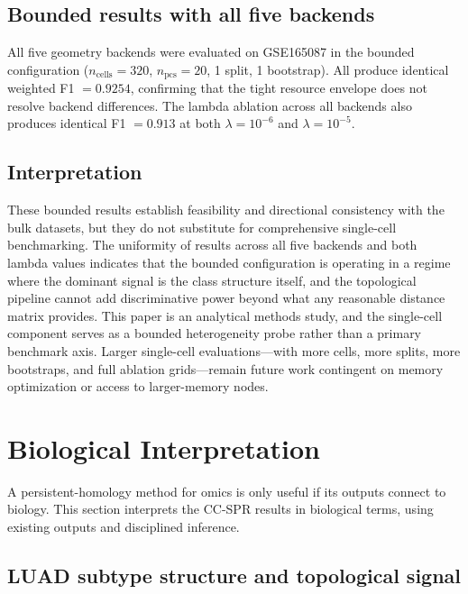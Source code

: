 \documentclass[11pt]{article}
\begin{document}
\subsection{Bounded results with all five backends}

All five geometry backends were evaluated on GSE165087 in the bounded configuration ($n_{\text{cells}} = 320$, $n_{\text{pcs}} = 20$, 1 split, 1 bootstrap).
All produce identical weighted F1 $= 0.9254$, confirming that the tight resource envelope does not resolve backend differences.
The lambda ablation across all backends also produces identical F1 $= 0.913$ at both $\lambda = 10^{-6}$ and $\lambda = 10^{-5}$.

\subsection{Interpretation}

These bounded results establish feasibility and directional consistency with the bulk datasets, but they do not substitute for comprehensive single-cell benchmarking.
The uniformity of results across all five backends and both lambda values indicates that the bounded configuration is operating in a regime where the dominant signal is the class structure itself, and the topological pipeline cannot add discriminative power beyond what any reasonable distance matrix provides.
This paper is an analytical methods study, and the single-cell component serves as a bounded heterogeneity probe rather than a primary benchmark axis.
Larger single-cell evaluations---with more cells, more splits, more bootstraps, and full ablation grids---remain future work contingent on memory optimization or access to larger-memory nodes.

\section{Biological Interpretation}
\label{sec:biology}

A persistent-homology method for omics is only useful if its outputs connect to biology.
This section interprets the CC-SPR results in biological terms, using existing outputs and disciplined inference.

\subsection{LUAD subtype structure and topological signal}
\end{document}
